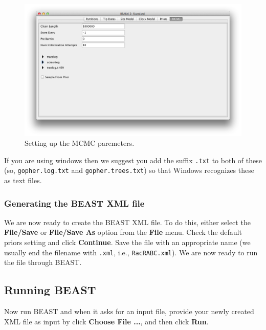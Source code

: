 \documentclass{article}
\begin{document}
\begin{figure}
\begin{center}

\includegraphics[scale=0.4]{figures/BEAUti_MCMC}

\end{center}
\caption{\label{fig.MCMC} Setting up the MCMC paremeters.}
\end{figure}


If you are using windows then we suggest you add the suffix \texttt{.txt} to both of these (so,
\texttt{gopher.log.txt} and \texttt{gopher.trees.txt}) so that Windows recognizes
these as text files. 

\subsubsection*{Generating the BEAST XML file }

We are now ready to create the BEAST XML file. To do this, either select the {\bf File/Save} or {\bf File/Save As} option from the \textbf{File} menu. Check the default priors setting and click \textbf{Continue}. Save the file with an appropriate name (we usually end the filename with \texttt{.xml}, i.e., \texttt{RacRABC.xml}). We are now ready to run the file through BEAST. 

\subsection*{Running BEAST }

Now run BEAST and when it asks for an input file, provide your newly
created XML file as input by click \textbf{Choose File ...}, and then click \textbf{Run}. 
\end{document}
